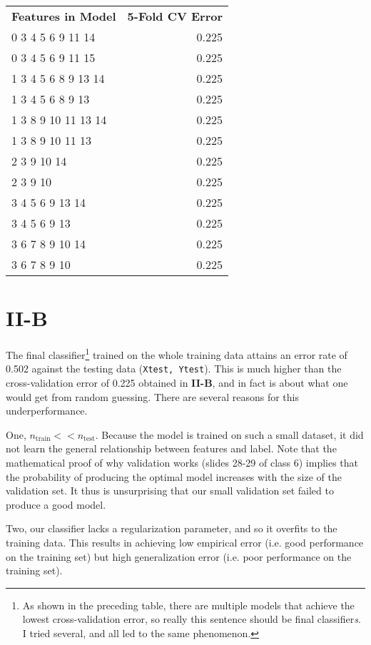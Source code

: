 \documentclass{article}
\begin{document}
\begin{table}[h!]
	\centering
	\begin{tabular}{|l r|}
		\hline
		\textbf{Features in Model} & \textbf{5-Fold CV Error} \\
		0  3  4  5  6  9 11 14 & 0.225 \\
		0  3  4  5  6  9 11 15 & 0.225 \\
		1  3  4  5  6  8  9 13 14 & 0.225 \\
		1  3  4  5  6  8  9 13 & 0.225 \\
		1  3  8  9 10 11 13 14 & 0.225 \\
		1  3  8  9 10 11 13 & 0.225 \\
		2  3  9 10 14 & 0.225 \\
		2  3  9 10 & 0.225 \\
		3  4  5  6  9 13 14 & 0.225 \\
		3  4  5  6  9 13 & 0.225 \\
		3  6  7  8  9 10 14 & 0.225 \\
		3  6  7  8  9 10 & 0.225 \\
		\hline
	\end{tabular}
\end{table}

\section*{II-B}

The final classifier\footnote{As shown in the preceding table, there are
multiple models that achieve the lowest cross-validation error, so really this
sentence should be final classifier\textit{s}. I tried several, and all led to
the same phenomenon.} trained on the whole training data attains an error rate of
0.502 against the testing data (\texttt{Xtest, Ytest}). This is much higher
than the cross-validation error of 0.225 obtained in \textbf{II-B}, and in fact
is about what one would get from random guessing. There are several reasons for
this underperformance.

One, $n_{\mathrm{train}} << n_{\mathrm{test}}$. Because the model is trained on
such a small dataset, it did not learn the general relationship between features
and label. Note that the mathematical proof of why validation works (slides 28-29 
of class 6) implies that the probability of producing the optimal model
increases with the size of the validation set. It thus is
unsurprising that our small validation set failed to produce a good model.

Two, our classifier lacks a regularization parameter, and so it overfits to the
training data. This results in achieving low empirical error (i.e. good
performance on the training set) but high generalization error (i.e. poor
performance on the training set).
\end{document}
